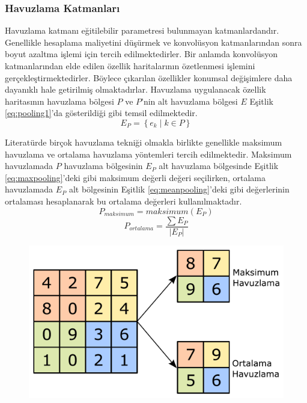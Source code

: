\subsubsection{Havuzlama Katmanları}
Havuzlama katmanı eğitilebilir parametresi bulunmayan katmanlardandır. Genellikle hesaplama maliyetini düşürmek ve konvolüsyon katmanlarından sonra boyut azaltma işlemi için tercih edilmektedirler. Bir anlamda konvolüsyon katmanlarından elde edilen özellik haritalarının özetlenmesi işlemini gerçekleştirmektedirler. Böylece çıkarılan özellikler konumsal değişimlere daha dayanıklı hale getirilmiş olmaktadırlar. Havuzlama uygulanacak özellik haritasının havuzlama bölgesi $P$ ve $P$'nin alt havuzlama bölgesi $E$ Eşitlik \ref{eq:pooling1}'da gösterildiği gibi temsil edilmektedir.
\begin{equation}
	\label{eq:pooling1}
	E_{P} = \left\{ e_{k} \mid k \in P \right\}
\end{equation}
    
Literatürde birçok havuzlama tekniği olmakla birlikte genellikle maksimum havuzlama ve ortalama havuzlama yöntemleri tercih edilmektedir. Maksimum havuzlamada $P$ havuzlama bölgesinin $E_{P}$ alt havuzlama bölgesinde Eşitlik \ref{eq:maxpooling}'deki gibi maksimum değerli değeri seçilirken, ortalama havuzlamada $E_{P}$ alt bölgesinin Eşitlik \ref{eq:meanpooling}'deki gibi değerlerinin ortalaması hesaplanarak bu ortalama değerleri kullanılmaktadır.
\begin{equation}
	\label{eq:maxpooling}
	P_{maksimum} = maksimum(E_{P})
\end{equation}
\vspace{-1cm}
\begin{equation}
	\label{eq:meanpooling}
	P_{ortalama} = \frac{\sum E_{P}}{\left| E_{P} \right|}
\end{equation}

\begin{figure}[h!]
	\begin{center}
		\vspace{0.4cm}
		{
			\vspace{0.4cm}
			\includegraphics[scale=0.5]{Yapilan-Calismalar/Figures/pooling.pdf}
		}
	\end{center}
\end{figure}


